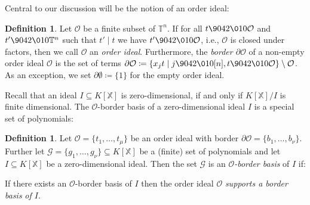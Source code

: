 \documentclass[11pt,oneside,english]{amsart}
\makeatletter
\numberwithin{equation}{section}
\numberwithin{figure}{section}
\theoremstyle{plain}
\theoremstyle{definition}
\newtheorem{defn}[thm]{Definition}
\theoremstyle{definition}
\theoremstyle{remark}
\theoremstyle{plain}
\theoremstyle{plain}
\theoremstyle{plain}
\theoremstyle{problem@}
\makeatother
\begin{document}
Central to our discussion will be the notion of an order ideal:
\begin{defn}
Let ${\mathcal{O}}$ be a finite subset of ${\mathbb{T}}^{n}$. If for all $t{\9042\010}{\mathcal{O}}$
and $t'{\9042\010}{\mathbb{T}}^{n}$ such that $t'\mid t$ we have $t'{\9042\010}{\mathcal{O}}$, i.e.,
${\mathcal{O}}$ is closed under factors, then we call ${\mathcal{O}}$ an \emph{order
ideal}. Furthermore, the \emph{border $\partial{\mathcal{O}}$} of a non-empty
order ideal ${\mathcal{O}}$ is the set of terms $\partial{\mathcal{O}}\coloneqq \{x_{j}t\mid j{\9042\010}[n],t{\9042\010}{\mathcal{O}}\}\setminus{\mathcal{O}}$.
As an exception,
we set $\partial\emptyset\coloneqq \{1\}$ for the empty order ideal.
\end{defn}
Recall that an ideal $I\subseteq{K[\mathbb{X}]}$ is zero-dimensional, if and only if ${K[\mathbb{X}]}/I$
is finite dimensional. The ${\mathcal{O}}$-border basis of a zero-dimensional
ideal $I$ is a special set of polynomials:
\begin{defn}\label{def:bbasis}
Let ${\mathcal{O}}=\{t_{1},\dots,t_{\mu}\}$ be an order ideal with border $\partial{\mathcal{O}}=\{b_{1},\dots,b_{\nu}\}$.
Further let $\mathcal{G}=\{g_{1},\dots,g_{\nu}\}\subseteq{K[\mathbb{X}]}$
be a (finite) set of polynomials and let $I\subseteq{K[\mathbb{X}]}$ be a
zero-dimensional ideal. Then the set $\mathcal{G}$ is an \emph{${\mathcal{O}}$-border
basis} of \(I\) if:
If there exists an ${\mathcal{O}}$-border basis of $I$ then the order
ideal ${\mathcal{O}}$ \emph{supports a border basis} \emph{of $I$}.
\end{defn}
\end{document}

